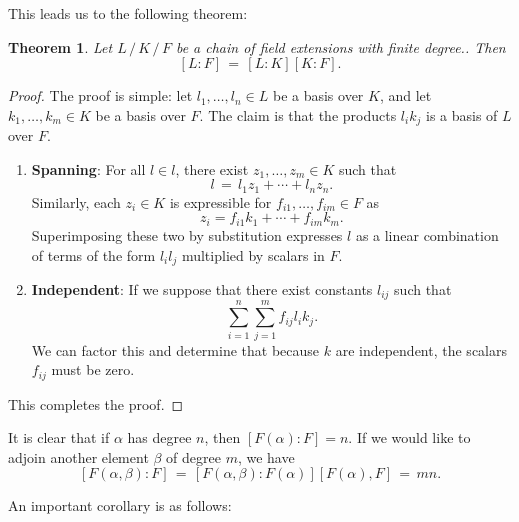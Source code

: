 \documentclass[11pt]{article}
\newtheorem{theorem}{Theorem}
\begin{document}
This leads us to the following theorem:

\begin{adjustwidth}{0.5cm}{}
  \begin{theorem}
    Let $L \, / \, K \, / \, F$ be a chain of field extensions with finite degree.. Then
    \[
      [L : F] \, = \, [L : K] [K : F].
    \]
  \end{theorem}
  \begin{proof}
    The proof is simple: let $l_{1}, \ldots, l_{n} \in L$ be a basis over $K$, and let $k_{1}, \ldots, k_{m} \in K$ be a basis over $F$. The claim is that the products $l_{i}k_{j}$ is a basis of $L$ over $F$.
    \begin{enumerate}
      \item \textbf{Spanning}: For all $l \in l$, there exist $z_{1}, \ldots, z_{m} \in K$ such that
      \[
        l \, = \, l_{1} z_{1} + \cdots + l_{n} z_{n}.
      \]
      Similarly, each $z_{i} \in K$ is expressible for $f_{i1}, \ldots, f_{im} \in F$ as
      \[
        z_{i} = f_{i1} k_{1} + \cdots + f_{im} k_{m}.
      \]
      Superimposing these two by substitution expresses $l$ as a linear combination of terms of the form $l_{i}l_{j}$ multiplied by scalars in $F$.
      \item \textbf{Independent}: If we suppose that there exist constants $l_{ij}$ such that
      \[
        \sum\limits_{i = 1}^{n} \sum\limits_{j = 1}^{m} f_{ij} l_{i} k_{j}.
      \]
      We can factor this and determine that because $k$ are independent, the scalars $f_{ij}$ must be zero.
    \end{enumerate}
    This completes the proof.
  \end{proof}
\end{adjustwidth}

It is clear that if $\alpha$ has degree $n$, then $[F(\alpha) : F] = n$. If we would like to adjoin another element $\beta$ of degree $m$, we have
\[
  [F(\alpha, \beta) : F] \, = \, [F(\alpha, \beta) : F(\alpha)] [F(\alpha), F] \, = \, mn.
\]

An important corollary is as follows:
\end{document}
